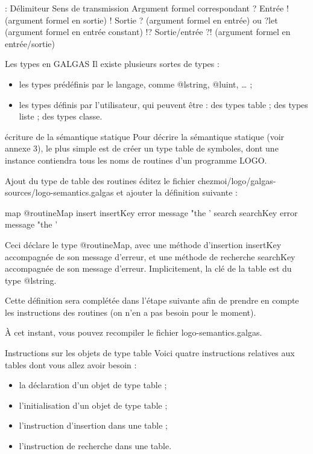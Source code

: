 :
Délimiteur	Sens de transmission	Argument formel correspondant
?	Entrée	! (argument formel en sortie)
!	Sortie	? (argument formel en entrée) ou
?let (argument formel en entrée constant)
!?	Sortie/entrée	?! (argument formel en entrée/sortie)

Les types en GALGAS
Il existe plusieurs sortes de types :
\begin{itemize}
  \item les types prédéfinis par le langage, comme @lstring, @luint, … ;
  \item les types définis par l'utilisateur, qui peuvent être :
	des types table ;
	des types liste ;
	des types classe.
\end{itemize}

écriture de la sémantique statique
Pour décrire la sémantique statique (voir annexe 3), le plus simple est de créer un type table de symboles, dont une instance contiendra tous les noms de routines d'un programme LOGO.

Ajout du type de table des routines
éditez le fichier chezmoi/logo/galgas-sources/logo-semantics.galgas et ajouter la définition suivante :

\begin{galgascode}
map @routineMap {
  insert insertKey error message "the '%
  search searchKey error message "the '%
}
\end{galgascode}

Ceci déclare le type @routineMap, avec une méthode d'insertion insertKey accompagnée de son message d'erreur, et une méthode de recherche searchKey accompagnée de son message d'erreur. Implicitement, la clé de la table est du type @lstring.

Cette définition sera complétée dans l'étape suivante afin de prendre en compte les instructions des routines (on n'en a pas besoin pour le moment).

À cet instant, vous pouvez recompiler le fichier logo-semantics.galgas.

Instructions sur les objets de type table
Voici quatre instructions relatives aux tables dont vous allez avoir besoin :
\begin{itemize}
  \item la déclaration d'un objet de type table ;
  \item l'initialisation d'un objet de type table ;
  \item l'instruction d'insertion dans une table ;
  \item l'instruction de recherche dans une table.
\end{itemize}


